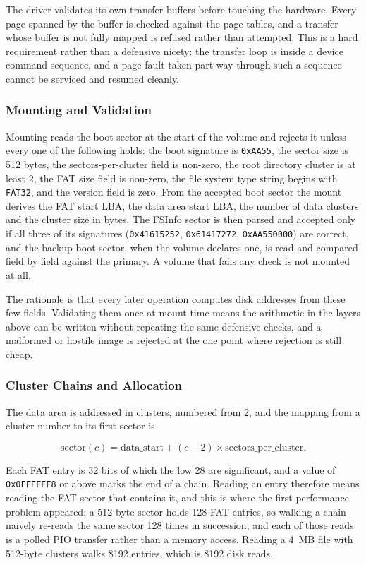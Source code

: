 The driver validates its own transfer buffers before touching the hardware.
Every page spanned by the buffer is checked against the page tables, and a
transfer whose buffer is not fully mapped is refused rather than attempted.
This is a hard requirement rather than a defensive nicety: the transfer loop is
inside a device command sequence, and a page fault taken part-way through such
a sequence cannot be serviced and resumed cleanly.

\subsubsection{Mounting and Validation}

Mounting reads the boot sector at the start of the volume and rejects it unless
every one of the following holds: the boot signature is \texttt{0xAA55}, the
sector size is 512 bytes, the sectors-per-cluster field is non-zero, the root
directory cluster is at least 2, the FAT size field is non-zero, the file system
type string begins with \texttt{FAT32}, and the version field is zero. From the
accepted boot sector the mount derives the FAT start LBA, the data area start
LBA, the number of data clusters and the cluster size in bytes. The FSInfo
sector is then parsed and accepted only if all three of its signatures
(\texttt{0x41615252}, \texttt{0x61417272}, \texttt{0xAA550000}) are correct, and
the backup boot sector, when the volume declares one, is read and compared
field by field against the primary. A volume that fails any check is not
mounted at all.

The rationale is that every later operation computes disk addresses from these
few fields. Validating them once at mount time means the arithmetic in the
layers above can be written without repeating the same defensive checks, and a
malformed or hostile image is rejected at the one point where rejection is
still cheap.

\subsubsection{Cluster Chains and Allocation}

The data area is addressed in clusters, numbered from 2, and the mapping from a
cluster number to its first sector is

\[
    \mathrm{sector}(c) = \mathrm{data\_start} + (c - 2) \times \mathrm{sectors\_per\_cluster}.
\]

Each FAT entry is 32 bits of which the low 28 are significant, and a value of
\texttt{0x0FFFFFF8} or above marks the end of a chain. Reading an entry
therefore means reading the FAT sector that contains it, and this is where the
first performance problem appeared: a 512-byte sector holds 128 FAT entries, so
walking a chain naively re-reads the same sector 128 times in succession, and
each of those reads is a polled PIO transfer rather than a memory access.
Reading a 4~MB file with 512-byte clusters walks 8192 entries, which is 8192
disk reads.

